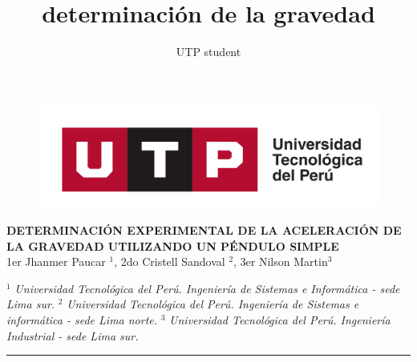 \documentclass[10pt,a4paper]{article}
\author{UTP student}
\title{determinación de la gravedad}
\begin{document}
	\begin{figure}[H]
		\raggedright
		\includegraphics[scale=0.1]{imagenes-proyecto/logo_utp.png}
	\end{figure}


	\begin{center}
		{\huge \textbf{DETERMINACIÓN EXPERIMENTAL DE LA ACELERACIÓN DE LA GRAVEDAD UTILIZANDO UN PÉNDULO SIMPLE}} \\
		
		\vspace{2mm}
		\Large {1er Jhanmer Paucar $^{1}$, 2do Cristell Sandoval $^{2}$, 3er Nilson Martin$^{3}$}
		
		\vspace{6mm}
		$^{1}$ \textit {Universidad Tecnológica del Perú. Ingeniería de Sistemas e Informática - sede Lima sur.} 
		$^{2}$ \textit {Universidad Tecnológica del Perú. Ingeniería de Sistemas e informática - sede Lima norte.} 
		$^{3}$ \textit {Universidad Tecnológica del Perú. Ingeniería Industrial - sede Lima sur.} 
	\end{center}
    \begin{center}
    	\rule{150mm}{0.2mm}
    \end{center}
\end{document}

